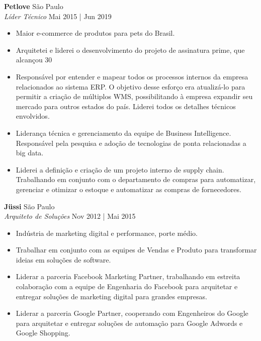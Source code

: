 \documentclass[a4paper]{article}
\begin{document}
\textbf{Petlove}                               \hfill São Paulo             \\
\textit{Líder Técnico}                             \hfill Mai 2015 |
Jun 2019   \\
\vspace{-3mm}
\begin{itemize}
	\setlength\itemsep{-1mm}
	\item Maior e-commerce de produtos para pets do Brasil. 
\item Arquitetei e liderei o desenvolvimento do projeto de assinatura prime, que alcançou 30%
\item Responsável por entender e mapear todos os processos internos da empresa relacionados ao sistema ERP. 
O objetivo desse esforço era atualizá-lo para permitir a criação de múltiplos WMS, possibilitando à empresa expandir seu mercado para outros estados do país. 
Liderei todos os detalhes técnicos envolvidos.
	\item Liderança técnica e gerenciamento da equipe de Business Intelligence. 
Responsável pela pesquisa e adoção de tecnologias de ponta relacionadas a big data. 
\item Liderei a definição e criação de um projeto interno de supply chain. 
Trabalhando em conjunto com o departamento de compras para automatizar, gerenciar e otimizar o estoque e automatizar as compras de fornecedores. 
\end{itemize}
\vspace{-1.5mm}

\textbf{Jüssi}                                 \hfill São Paulo         \\
\textit{Arquiteto de Soluções} \hfill Nov 2012 |
Mai 2015                 \\
\vspace{-3mm}
\begin{itemize}
	\setlength\itemsep{-1mm}
	\item Indústria de marketing digital e performance, porte médio. 
\item Trabalhar em conjunto com as equipes de Vendas e Produto para transformar ideias em soluções de software. 
\item Liderar a parceria Facebook Marketing Partner, trabalhando em estreita colaboração com a equipe de Engenharia do Facebook para arquitetar e entregar soluções de marketing digital para grandes empresas. 
\item Liderar a parceria Google Partner, cooperando com Engenheiros do Google para arquitetar e entregar soluções de automação para Google Adwords e Google Shopping. 
\end{itemize}
\vspace{-2mm}
\end{document}
